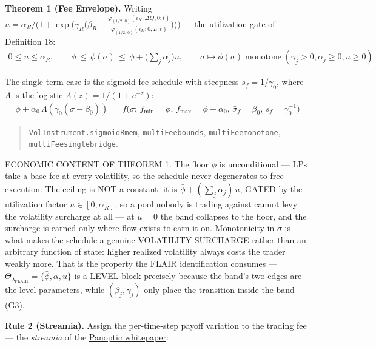\documentclass[11pt]{article}
\renewcommand{\_}{\textunderscore\allowbreak}
\begin{document}
\textbf{Theorem 1 (Fee Envelope).} Writing \(u = \alpha_R\Big/\Big(1+\exp\Big(\gamma_R\Big(\beta_R - \frac{\varphi_{(1/2,\,0)}(i_K;\Delta Q,0;t)}{\varphi_{(1/2,\,0)}(i_K;0,L;t)}\Big)\Big)\Big)\) --- the utilization gate of Definition 18: \[
    \begin{aligned}
        0 \leq u \leq \alpha_R, \qquad
        \bar\phi \, \leq \, \phi(\sigma) \, \leq \, \bar\phi + \Big(\sum_j \alpha_j\Big)u, \qquad
        \sigma \mapsto \phi(\sigma) \; \text{monotone} \; (\gamma_j > 0, \alpha_j \geq 0, u \geq 0)
    \end{aligned}
\]

The single-term case is the sigmoid fee schedule with steepness \(s_f = 1/\gamma_0\), where \(\Lambda\) is the logistic \(\Lambda(z) = 1/(1+e^{-z})\): \[
    \begin{aligned}
        \bar\phi + \alpha_0\,\Lambda(\gamma_0(\sigma-\beta_0)) \, = \, f\big(\sigma;\, f_{\min}=\bar\phi,\, f_{\max}=\bar\phi+\alpha_0,\, \bar\sigma_f=\beta_0,\, s_f=\gamma_0^{-1}\big)
    \end{aligned}
\]

\begin{quote}
\texttt{VolInstrument.sigmoidR\_mem}, \texttt{multiFee\_bounds}, \texttt{multiFee\_monotone}, \texttt{multiFee\_single\_bridge}.
\end{quote}

ECONOMIC CONTENT OF THEOREM 1. The floor \(\bar\phi\) is unconditional --- LPs take a base fee at every volatility, so the schedule never degenerates to free execution. The ceiling is NOT a constant: it is \(\bar\phi + (\sum_j\alpha_j)\,u\), GATED by the utilization factor \(u \in [0,\alpha_R]\), so a pool nobody is trading against cannot levy the volatility surcharge at all --- at \(u = 0\) the band collapses to the floor, and the surcharge is earned only where flow exists to earn it on. Monotonicity in \(\sigma\) is what makes the schedule a genuine VOLATILITY SURCHARGE rather than an arbitrary function of state: higher realized volatility always costs the trader weakly more. That is the property the FLAIR identification consumes --- \(\Theta_{\lambda_{\text{FLAIR}}} = \{\bar\phi, \alpha, u\}\) is a LEVEL block precisely because the band's two edges are the level parameters, while \((\beta_j,\gamma_j)\) only place the transition inside the band (G3).

\textbf{Rule 2 (Streamia).} Assign the per-time-step payoff variation to the trading fee --- the \emph{streamia} of the \href{https://arxiv.org/pdf/2204.14232}{Panoptic whitepaper}:
\end{document}
